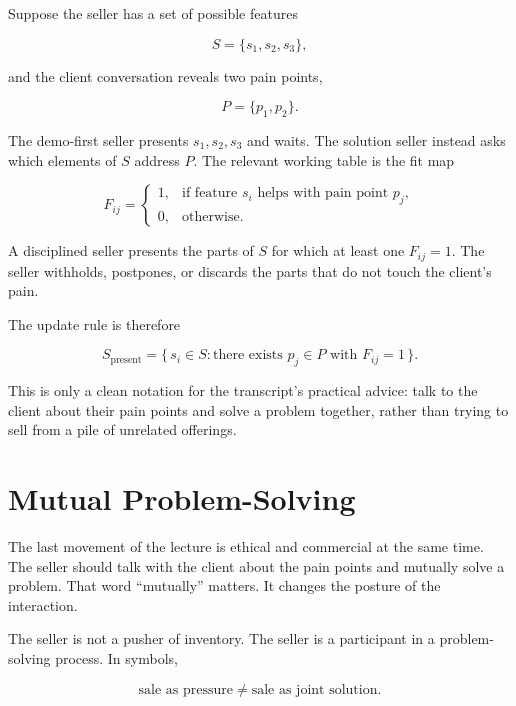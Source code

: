 Suppose the seller has a set of possible features

\begin{equation}
S=\{s_1,s_2,s_3\},
\end{equation}

and the client conversation reveals two pain points,

\begin{equation}
P=\{p_1,p_2\}.
\end{equation}

The demo-first seller presents \(s_1,s_2,s_3\) and waits. The solution seller instead asks which elements of \(S\) address \(P\). The relevant working table is the fit map

\begin{equation}
F_{ij}=
\begin{cases}
1, & \text{if feature } s_i \text{ helps with pain point } p_j,\\
0, & \text{otherwise.}
\end{cases}
\end{equation}

A disciplined seller presents the parts of \(S\) for which at least one \(F_{ij}=1\). The seller withholds, postpones, or discards the parts that do not touch the client's pain.

The update rule is therefore

\begin{equation}
S_{\text{present}}
=
\{\,s_i \in S : \text{there exists } p_j \in P
\text{ with } F_{ij}=1\,\}.
\end{equation}

This is only a clean notation for the transcript's practical advice: talk to the client about their pain points and solve a problem together, rather than trying to sell from a pile of unrelated offerings.

\section{Mutual Problem-Solving}

The last movement of the lecture is ethical and commercial at the same time. The seller should talk with the client about the pain points and mutually solve a problem. That word ``mutually'' matters. It changes the posture of the interaction.

The seller is not a pusher of inventory. The seller is a participant in a problem-solving process. In symbols,

\begin{equation}
\text{sale as pressure}
\neq
\text{sale as joint solution}.
\end{equation}

